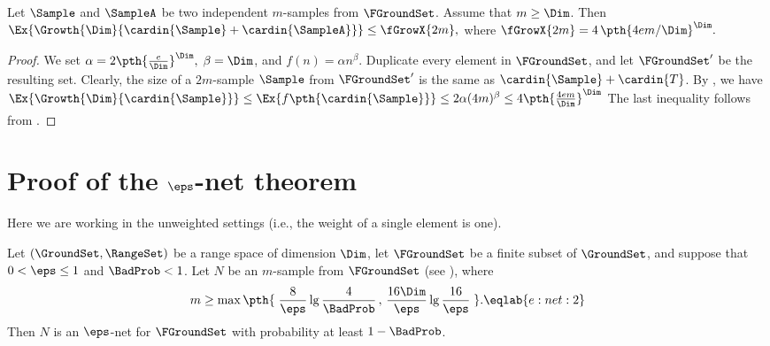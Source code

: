 \begin{lemma}
    Let $\Sample$ and $\SampleA$ be two independent $m$-samples from
    $\FGroundSet$. Assume that $m \geq \Dim$. Then
    \begin{math}
        \Ex{\bigl. \Growth{\Dim}{\bigl.\cardin{\Sample} +
              \cardin{\SampleA}} }%
        \leq%
        \fGrowX{2m},
    \end{math}
    where 
    \begin{math}
        \fGrowX{2m} = 4 \, \pth{{4 e m}/{\Dim}}^{\Dim}.
  \end{math}
\end{lemma}
\begin{proof}
    We set
    \begin{math}
        \alpha = 2 \pth{\frac{ e}{\Dim}}^\Dim,
    \end{math}
    $\beta = \Dim$, and $f(n) = \alpha n^\beta$. Duplicate every
    element in $\FGroundSet$, and let $\FGroundSet'$ be the resulting
    set. Clearly, the size of a $2m$-sample $\Sample$ from
    $\FGroundSet'$ is the same as $\cardin{\Sample} + \cardin{T}$.  By
    , we have
    \begin{math}
      \Ex{\Bigl. \Growth{\Dim}{\bigl.\cardin{\Sample}} }%
      \leq %
      \Ex{\Bigl. f \pth{\bigl.\cardin{\Sample}} }%
      \leq %
      2 \alpha (4m)^\beta%
      \leq%
      4 \pth{\frac{ 4em}{\Dim}}^\Dim
    \end{math}
    The last inequality follows from .
\end{proof}




\section{Proof of the $\eps$-net theorem}

Here we are working in the unweighted settings (i.e., the weight of a
single element is one).

\begin{theorem}
    Let $(\GroundSet,\RangeSet)$ be a range space of \VC dimension
    $\Dim$, let $\FGroundSet$ be a finite subset of $\GroundSet$, and
    suppose that $0 < \eps \leq 1$ and $\BadProb < 1$. Let $N$ be an
    $m$-sample from $\FGroundSet$ (see ), where
    \begin{equation}
        m \geq \max\pth{\;
           \frac{8}{\eps} \lg \frac{4}{\BadProb} \,,\,
           \frac{16\Dim}{\eps}\lg \frac{16}{\eps} \;}.
        \eqlab{e:net:2}
    \end{equation}
    Then $N$ is an $\eps$-net for $\FGroundSet$ with probability at
    least $1-\BadProb$.
\end{theorem}


